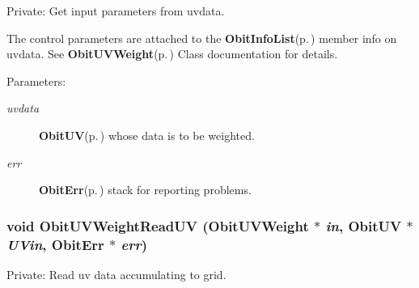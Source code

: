 Private: Get input parameters from uvdata. 

The control parameters are attached to the {\bf Obit\-Info\-List}{\rm (p.\,\pageref{structObitInfoList})} member info on uvdata. See {\bf Obit\-UVWeight}{\rm (p.\,\pageref{structObitUVWeight})} Class documentation for details. \begin{Desc}
\item[Parameters:]
\begin{description}
\item[{\em uvdata}]{\bf Obit\-UV}{\rm (p.\,\pageref{structObitUV})} whose data is to be weighted. \item[{\em err}]{\bf Obit\-Err}{\rm (p.\,\pageref{structObitErr})} stack for reporting problems. \end{description}
\end{Desc}
\subsubsection{\setlength{\rightskip}{0pt plus 5cm}void Obit\-UVWeight\-Read\-UV ({\bf Obit\-UVWeight} $\ast$ {\em in}, {\bf Obit\-UV} $\ast$ {\em UVin}, {\bf Obit\-Err} $\ast$ {\em err})}\label{ObitUVWeight_8c_a11}


Private: Read uv data accumulating to grid. 

